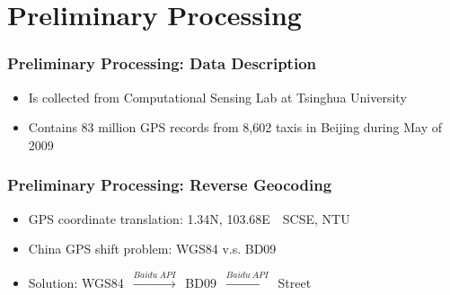 \documentclass{beamer}
\theoremstyle{definition}
\begin{document}
\section{Preliminary Processing}
\begin{frame}
\frametitle{Preliminary Processing: Data Description}

\begin{itemize}
	\item Is collected from Computational Sensing Lab at Tsinghua University
	\item Contains 83 million GPS records from 8,602 taxis in Beijing during May of 2009
\end{itemize}

\begin{table}[h!]
\centering
{}
\caption{A summary of the seven original fields}\label{Ta:orig_field}
\end{table}
\end{frame}

\begin{frame}
\frametitle{Preliminary Processing: Reverse Geocoding}
\begin{itemize}
	\item <2-> GPS coordinate translation: 1.34\textdegree N, 103.68\textdegree E~\textrightarrow~SCSE, NTU
	\item <3-> China GPS shift problem: WGS84 v.s. BD09
	\item <4-> Solution: WGS84~$\xrightarrow{Baidu\ API}$~BD09~$\xrightarrow{Baidu\ API}$~Street
\end{itemize}
\end{frame}
\end{document}
